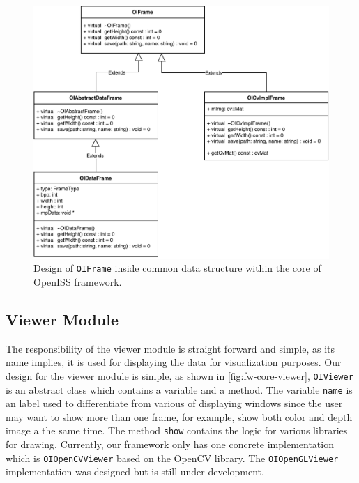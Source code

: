 \begin{figure}
    \centering
    \includegraphics[width=\linewidth]{figures/framework_core_oiframe.pdf}
    \caption{
        Design of \texttt{OIFrame} inside common data structure within the core
        of OpenISS framework.
    }
    \label{fig:fw-core-oiframe}
\end{figure}

\subsection{Viewer Module}
\label{sec:fw-design-core-viewer}

The responsibility of the viewer module is straight forward and simple, as its name
implies, it is used for displaying the data for visualization purposes. Our
design for the viewer module is simple, as shown in
\autoref{fig:fw-core-viewer}, \texttt{OIViewer} is an abstract class which
contains a variable and a method. The variable \texttt{name} is an label used
to differentiate from various of displaying windows since the user may want to
show more than one frame, for example, show both color and depth image a the
same time.
The method \texttt{show} contains the logic for various libraries for
drawing. Currently, our framework only has one concrete implementation which
is \texttt{OIOpenCVViewer} based on the OpenCV library.
The \texttt{OIOpenGLViewer} implementation was designed but is still under
development.

